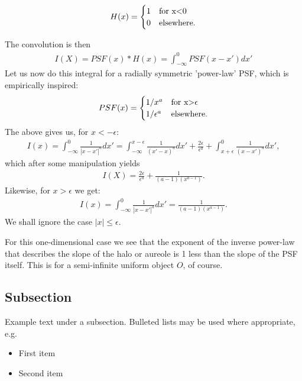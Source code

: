 \documentclass[fleqn,14pt]{wlscirep}
\begin{document}
\begin{equation*}
    H(x) = \begin{cases}
               1 & \text{for x}$<$0\\
               0 & \text{elsewhere}.
           \end{cases}
\end{equation*}

The convolution is then
\begin{eqnarray}
I(X) = PSF(x)*H(x) = \int_{-\infty}^{0} PSF(x-x') dx'
\end{eqnarray}
Let us now do this integral for a radially symmetric 'power-law' PSF, which is empirically inspired:
\begin{equation*}
    PSF(x) = \begin{cases}
               1/x^a        & \text{for x}$>$\epsilon\\
               1/\epsilon^a & \text{elsewhere}.
           \end{cases}
\end{equation*}
The above gives us, for $x<-\epsilon$:
\begin{eqnarray}
I(x) = \int_{-\infty}^{0} \frac{1}{|x-x'|^a} dx' = \int_{-\infty}^{x-\epsilon} \frac{1}{(x'-x)^a} dx' + \frac{2\epsilon}{\epsilon^a} + \int_{x+\epsilon}^{0} \frac{1}{(x-x')^a} dx',
\end{eqnarray}
which after some manipulation yields
\begin{eqnarray}
I(X) = \frac{2\epsilon}{\epsilon^a} + \frac{1}{(a-1)(x^{a-1})}.
\end{eqnarray}
Likewise, for $x>\epsilon$ we get:
\begin{eqnarray}
I(x) = \int_{-\infty}^{0} \frac{1}{|x-x'|^a} dx' = \frac{1}{(a-1)(x^{a-1})}.
\end{eqnarray}
We shall ignore the case $|x| \leq \epsilon$.

For this one-dimensional case we see that the exponent of the inverse power-law that describes the slope of the halo or aureole is 1 less than the slope of the PSF itself. This is for a semi-infinite uniform object $O$, of course.



\subsection*{Subsection}

Example text under a subsection. Bulleted lists may be used where appropriate, e.g.

\begin{itemize}
\item First item
\item Second item
\end{itemize}
\end{document}
